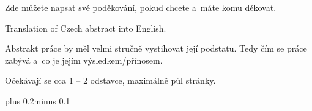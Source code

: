 \documentclass[11pt,twoside,a4paper]{book}
\begin{document}

\coverpagestarts


\acknowledgements
\noindent
Zde můžete napsat své poděkování, pokud chcete a~máte komu děkovat.





 
\abstractpage

Translation of Czech abstract into English.


\baselineskip

\noindent
Abstrakt práce by měl velmi stručně vystihovat její podstatu. Tedy čím se práce zabývá a~co je jejím výsledkem/přínosem.

\noindent
Očekávají se cca 1 -- 2 odstavce, maximálně půl stránky.


\tableofcontents



\listoffigures



\listoftables



\mainbodystarts
\normalfont
{}\baselineskip plus 0.2\baselineskip minus 0.1\baselineskip


\end{document}
